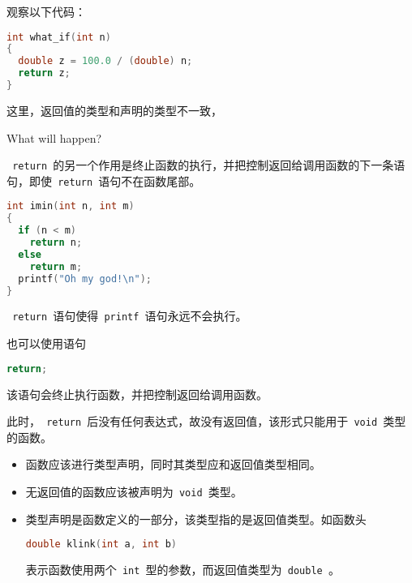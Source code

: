 \begin{frame}[fragile]
观察以下代码：
\begin{lstlisting}[language=c,backgroundcolor=\color{red!10}]
int what_if(int n)
{  
  double z = 100.0 / (double) n;
  return z;
}
\end{lstlisting}
这里，返回值的类型和声明的类型不一致，\vspace{0.1in}

{\Large What will happen?}
\pause 
\vspace{0.1in}


\end{frame}

\begin{frame}[fragile]
\lstinline| return |的另一个作用是终止函数的执行，并把控制返回给调用函数的下一条语句，即使\lstinline| return |语句不在函数尾部。 \pause \vspace{.1in}


\begin{lstlisting}[language=c,backgroundcolor=\color{red!10}]
int imin(int n, int m)
{  
  if (n < m)
    return n;
  else
    return m;  
  printf("Oh my god!\n");    
}
\end{lstlisting}
\lstinline| return |语句使得\lstinline| printf |语句永远不会执行。
\end{frame}

\begin{frame}[fragile]
也可以使用语句
\begin{lstlisting}[language=c,backgroundcolor=\color{red!10}]
return;
\end{lstlisting}
该语句会终止执行函数，并把控制返回给调用函数。 \vspace{.1in}


此时，\lstinline| return |后没有任何表达式，故没有返回值，该形式只能用于\lstinline| void |类型的函数。
\end{frame}

\begin{frame}[fragile]
\begin{itemize}
\item
函数应该进行类型声明，同时其类型应和返回值类型相同。\\[0.1in]
\item
无返回值的函数应该被声明为\lstinline| void |类型。\\[0.1in]
\item
类型声明是函数定义的一部分，该类型指的是返回值类型。如函数头
\begin{lstlisting}[language=c,backgroundcolor=\color{red!10}]
double klink(int a, int b)
\end{lstlisting}
表示函数使用两个\lstinline| int |型的参数，而返回值类型为\lstinline| double |。
\end{itemize}
\end{frame}


